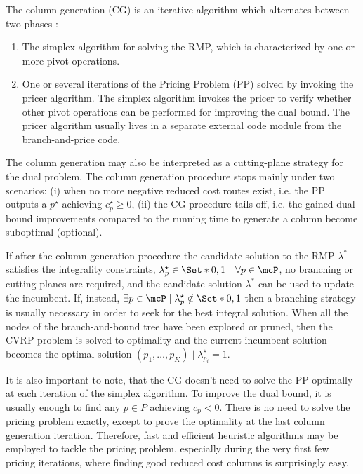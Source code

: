 \medskip

The column generation (CG) is an iterative algorithm which alternates between two phases \parencite{desaulniers2018}:
\begin{enumerate}
	\setlength{\itemsep}{0pt}
	\setlength{\parskip}{0pt}

	\item The simplex algorithm for solving the RMP, which is characterized by one or more pivot operations.
	\item One or several iterations of the Pricing Problem (PP) solved by invoking the pricer algorithm.
	      The simplex algorithm invokes the pricer to verify whether other pivot operations
	      can be performed for improving the dual bound.
	      The pricer algorithm usually lives in a separate external code module from the branch-and-price code.
\end{enumerate}

The column generation may also be interpreted as a cutting-plane strategy
for the dual problem.
The column generation procedure stops mainly under two scenarios:
(i) when no more negative reduced cost routes exist,
i.e. the PP outputs a $p^\star$ achieving $c^\star_p \ge 0$,
(ii) the CG procedure tails off,
i.e. the gained dual bound improvements
compared to the running time to generate a column
become suboptimal (optional).

If after the column generation procedure
the candidate solution to the RMP $\lambda^*$ satisfies the integrality constraints,
$\lambda^\star_p \in \Set*{0, 1} \quad \forall p \in \mcP$,
no branching or cutting planes are required,
and the candidate solution $\lambda^*$ can be used to update the incumbent.
If, instead,
$\exists p \in \mcP \mid \lambda^\star_p \notin \Set*{0, 1}$
then a branching strategy is usually necessary
in order to seek for the best integral solution.
When all the nodes of the branch-and-bound tree have been explored or pruned,
then the CVRP problem is solved to optimality
and the current incumbent solution becomes the optimal solution
$(p_1, \dots, p_K) \mid \lambda^\star_{p_i} = 1$.

\medskip

It is also important to note,
that the CG doesn't need to solve the PP optimally at each iteration of the simplex algorithm.
To improve the dual bound,
it is usually enough to find any $p \in P$ achieving $\bar{c}_p < 0$.
There is no need to solve the pricing problem exactly,
except to prove the optimality at the last column generation iteration.
Therefore, fast and efficient heuristic algorithms may be employed
to tackle the pricing problem,
especially during the very first few pricing iterations,
where finding good reduced cost columns is surprisingly easy.

